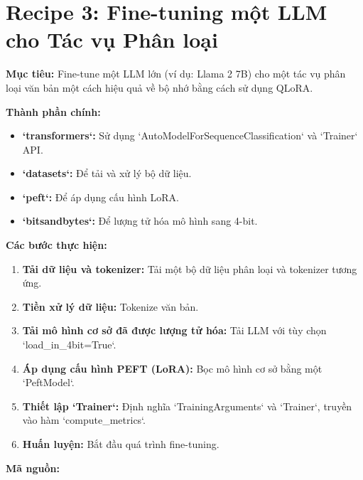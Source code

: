 
\section{Recipe 3: Fine-tuning một LLM cho Tác vụ Phân loại}
\label{sec:recipe_classification_finetuning}

\textbf{Mục tiêu:} Fine-tune một LLM lớn (ví dụ: Llama 2 7B) cho một tác vụ phân loại văn bản một cách hiệu quả về bộ nhớ bằng cách sử dụng QLoRA.

\textbf{Thành phần chính:}
\begin{itemize}
    \item \textbf{`transformers`:} Sử dụng `AutoModelForSequenceClassification` và `Trainer` API.
    \item \textbf{`datasets`:} Để tải và xử lý bộ dữ liệu.
    \item \textbf{`peft`:} Để áp dụng cấu hình LoRA.
    \item \textbf{`bitsandbytes`:} Để lượng tử hóa mô hình sang 4-bit.
\end{itemize}

\textbf{Các bước thực hiện:}
\begin{enumerate}
    \item \textbf{Tải dữ liệu và tokenizer:} Tải một bộ dữ liệu phân loại và tokenizer tương ứng.
    \item \textbf{Tiền xử lý dữ liệu:} Tokenize văn bản.
    \item \textbf{Tải mô hình cơ sở đã được lượng tử hóa:} Tải LLM với tùy chọn `load\_in\_4bit=True`.
    \item \textbf{Áp dụng cấu hình PEFT (LoRA):} Bọc mô hình cơ sở bằng một `PeftModel`.
    \item \textbf{Thiết lập `Trainer`:} Định nghĩa `TrainingArguments` và `Trainer`, truyền vào hàm `compute\_metrics`.
    \item \textbf{Huấn luyện:} Bắt đầu quá trình fine-tuning.
\end{enumerate}

\textbf{Mã nguồn:}

